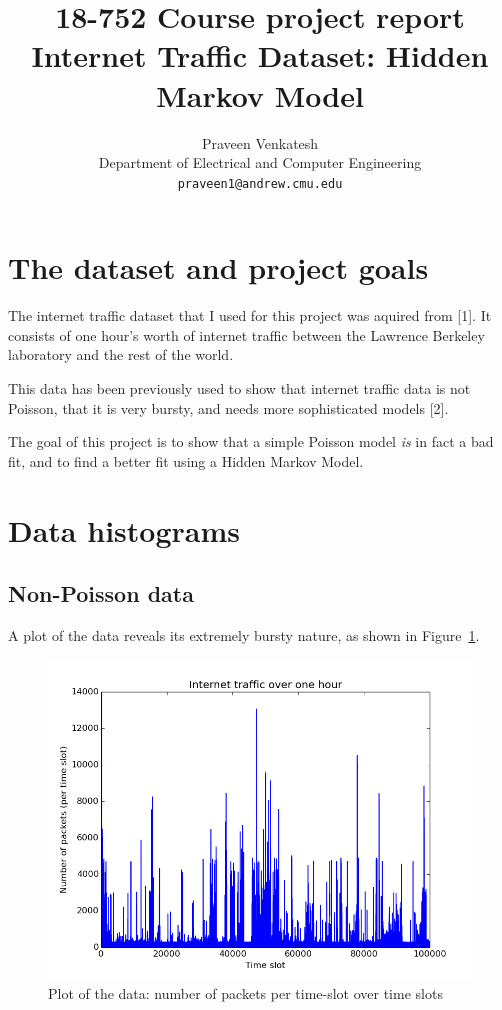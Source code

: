 \documentclass[11pt, twoside]{article}
\title{
	18-752 Course project report\\
	Internet Traffic Dataset: Hidden Markov Model
}
\date{}
\author{
	Praveen Venkatesh\\
	Department of Electrical and Computer Engineering\\
	\texttt{praveen1@andrew.cmu.edu}
}
\begin{document}
\maketitle

\section{The dataset and project goals}

The internet traffic dataset that I used for this project was aquired from [1]. It consists of one hour's worth of internet traffic between the Lawrence Berkeley laboratory and the rest of the world.

This data has been previously used to show that internet traffic data is not Poisson, that it is very bursty, and needs more sophisticated models [2].

The goal of this project is to show that a simple Poisson model \emph{is} in fact a bad fit, and to find a better fit using a Hidden Markov Model.

\section{Data histograms}

\subsection{Non-Poisson data}

A plot of the data reveals its extremely bursty nature, as shown in Figure~\ref{fig:data}.
\begin{figure}[h!]
	\centering
	\includegraphics[scale = 0.7]{data}
	\caption{Plot of the data: number of packets per time-slot over time slots}
	\label{fig:data}
\end{figure}
\end{document}
